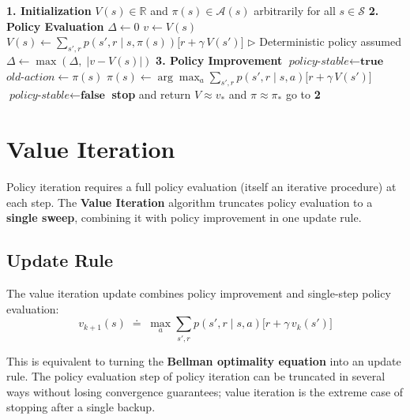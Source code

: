 \documentclass[11pt,a4paper]{article}
\theoremstyle{definition}
\theoremstyle{plain}
\theoremstyle{remark}
\begin{document}
\begin{algorithm}
\caption{Policy Iteration (using iterative policy evaluation), estimating $\pi \approx \pi_*$}
\begin{algorithmic}
\STATE \textbf{1. Initialization}
\STATE $V(s) \in \mathbb{R}$ and $\pi(s) \in \mathcal{A}(s)$ arbitrarily for all $s \in \mathcal{S}$
\STATE
\STATE \textbf{2. Policy Evaluation}
\REPEAT
    \STATE $\Delta \leftarrow 0$
        \STATE $v \leftarrow V(s)$
        \STATE $V(s) \leftarrow \sum_{s', r} p(s', r \mid s, \pi(s))\bigl[r + \gamma\, V(s')\bigr]$
        \hfill $\triangleright$ Deterministic policy assumed
        \STATE $\Delta \leftarrow \max(\Delta,\; |v - V(s)|)$
    \ENDFOR
\UNTIL{$\Delta < \theta$}
\STATE
\STATE \textbf{3. Policy Improvement}
\STATE $\textit{policy-stable} \leftarrow \textbf{true}$
    \STATE $\textit{old-action} \leftarrow \pi(s)$
    \STATE $\pi(s) \leftarrow \arg\max_a \sum_{s', r} p(s', r \mid s, a)\bigl[r + \gamma\, V(s')\bigr]$
        \STATE $\textit{policy-stable} \leftarrow \textbf{false}$
    \ENDIF
\ENDFOR
{}
    \STATE \textbf{stop} and return $V \approx v_*$ and $\pi \approx \pi_*$
\ELSE
    \STATE go to \textbf{2}
\ENDIF
\end{algorithmic}
\end{algorithm}

\section{Value Iteration}

Policy iteration requires a full policy evaluation (itself an iterative procedure) at each step. The \textbf{Value Iteration} algorithm truncates policy evaluation to a \textbf{single sweep}, combining it with policy improvement in one update rule.

\subsection{Update Rule}

The value iteration update combines policy improvement and single-step policy evaluation:
\[
    v_{k+1}(s) \;\doteq\; \max_a \sum_{s', r} p(s', r \mid s, a) \bigl[r + \gamma\, v_k(s')\bigr]
\]

This is equivalent to turning the \textbf{Bellman optimality equation} into an update rule. The policy evaluation step of policy iteration can be truncated in several ways without losing convergence guarantees; value iteration is the extreme case of stopping after a single backup.
\end{document}
